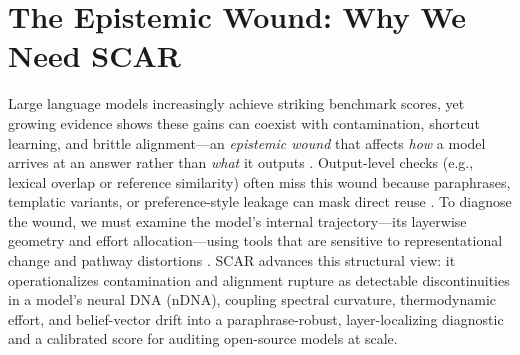 \documentclass[11pt]{article}
\begin{document}
% 

\section{The Epistemic Wound: Why We Need \textsc{SCAR}}
Large language models increasingly achieve striking benchmark scores, yet growing evidence shows these gains can coexist with contamination, shortcut learning, and brittle alignment—an \emph{epistemic wound} that affects \emph{how} a model arrives at an answer rather than \emph{what} it outputs \citep{dodge2021documenting,sainz2023need,deng2024investigating,geirhos2020shortcut}. Output-level checks (e.g., lexical overlap or reference similarity) often miss this wound because paraphrases, templatic variants, or preference-style leakage can mask direct reuse \citep{ribeiro2020checklist,iyyer2018scpn}. To diagnose the wound, we must examine the model’s internal trajectory—its layerwise geometry and effort allocation—using tools that are sensitive to representational change and pathway distortions \citep{raghu2017svcca,kornblith2019cka,ansuini2019intrinsic}. \textsc{SCAR} advances this structural view: it operationalizes contamination and alignment rupture as detectable discontinuities in a model’s neural DNA (nDNA), coupling spectral curvature, thermodynamic effort, and belief-vector drift into a paraphrase-robust, layer-localizing diagnostic and a calibrated score for auditing open-source models at scale.
\end{document}
